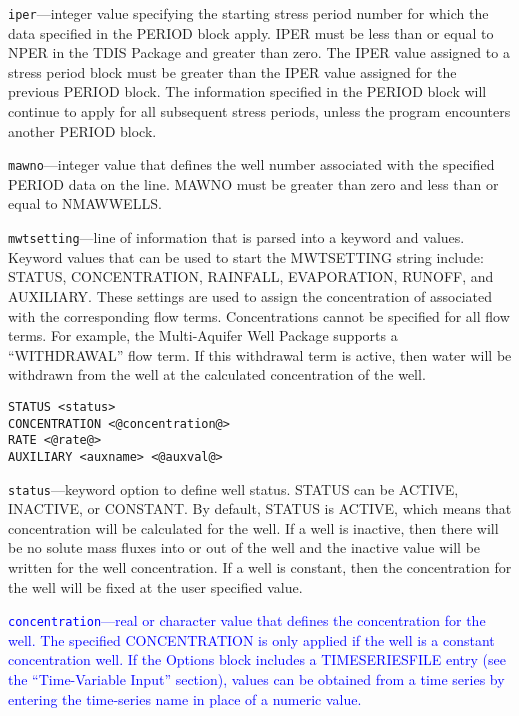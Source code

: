 \begin{description}
\item \texttt{iper}---integer value specifying the starting stress period number for which the data specified in the PERIOD block apply.  IPER must be less than or equal to NPER in the TDIS Package and greater than zero.  The IPER value assigned to a stress period block must be greater than the IPER value assigned for the previous PERIOD block.  The information specified in the PERIOD block will continue to apply for all subsequent stress periods, unless the program encounters another PERIOD block.

\item \texttt{mawno}---integer value that defines the well number associated with the specified PERIOD data on the line. MAWNO must be greater than zero and less than or equal to NMAWWELLS.

\item \texttt{mwtsetting}---line of information that is parsed into a keyword and values.  Keyword values that can be used to start the MWTSETTING string include: STATUS, CONCENTRATION, RAINFALL, EVAPORATION, RUNOFF, and AUXILIARY.  These settings are used to assign the concentration of associated with the corresponding flow terms.  Concentrations cannot be specified for all flow terms.  For example, the Multi-Aquifer Well Package supports a ``WITHDRAWAL'' flow term.  If this withdrawal term is active, then water will be withdrawn from the well at the calculated concentration of the well.

\begin{lstlisting}[style=blockdefinition]
STATUS <status>
CONCENTRATION <@concentration@>
RATE <@rate@>
AUXILIARY <auxname> <@auxval@> 
\end{lstlisting}

\item \texttt{status}---keyword option to define well status.  STATUS can be ACTIVE, INACTIVE, or CONSTANT. By default, STATUS is ACTIVE, which means that concentration will be calculated for the well.  If a well is inactive, then there will be no solute mass fluxes into or out of the well and the inactive value will be written for the well concentration.  If a well is constant, then the concentration for the well will be fixed at the user specified value.

\item \textcolor{blue}{\texttt{concentration}---real or character value that defines the concentration for the well. The specified CONCENTRATION is only applied if the well is a constant concentration well. If the Options block includes a TIMESERIESFILE entry (see the ``Time-Variable Input'' section), values can be obtained from a time series by entering the time-series name in place of a numeric value.}


\end{description}
